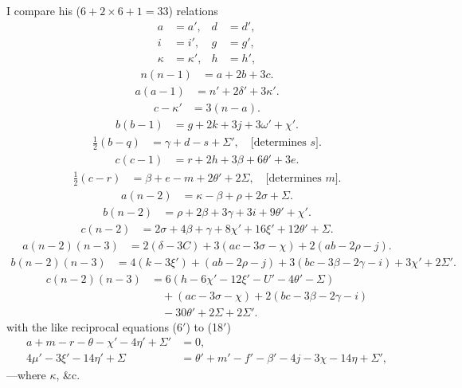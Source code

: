 \documentclass[11pt,a4paper]{article}
\theoremstyle{plain}
\theoremstyle{definition}
\theoremstyle{remark}
\begin{document}
I compare his ($6+2\times6+1=33$) relations
\begin{align*}
a &= a', & d &= d',\\
i &= i', & g &= g',\\
\kappa &= \kappa', & h &= h',
\end{align*}
\begin{align*}
n(n-1) &= a+2b+3c.\tag{6}
\end{align*}
\begin{align*}
a(a-1) &= n'+2\delta'+3\kappa'.\tag{7}
\end{align*}
\begin{align*}
c-\kappa' &= 3(n-a).\tag{8}
\end{align*}
\begin{align*}
b(b-1) &= g+2k+3j+3\omega'+\chi'.\tag{9}
\end{align*}
\begin{align*}
\tfrac{1}{2}(b-q) &= \gamma+d-s+\Sigma',\quad\text{[determines $s$].}\tag{10}
\end{align*}
\begin{align*}
c(c-1) &= r+2h+3\beta+6\theta'+3e.\tag{11}
\end{align*}
\begin{align*}
\tfrac{1}{2}(c-r) &= \beta+e-m+2\theta'+2\Sigma,\quad\text{[determines $m$].}\tag{12}
\end{align*}
\begin{align*}
a(n-2) &= \kappa-\beta+\rho+2\sigma+\Sigma.\tag{13}
\end{align*}
\begin{align*}
b(n-2) &= \rho+2\beta+3\gamma+3i+9\theta'+\chi'.\tag{14}
\end{align*}
\begin{align*}
c(n-2) &= 2\sigma+4\beta+\gamma+8\chi'+16\xi'+12\theta'+\Sigma.\tag{15}
\end{align*}
\begin{align*}
a(n-2)(n-3) &= 2(\delta-3C)+3(ac-3\sigma-\chi)+2(ab-2\rho-j).\tag{16}
\end{align*}
\begin{align*}
b(n-2)(n-3) &= 4(k-3\xi')+(ab-2\rho-j)+3(bc-3\beta-2\gamma-i)+3\chi'+2\Sigma'.\tag{17}
\end{align*}
\begin{align*}
c(n-2)(n-3) &= 6(h-6\chi'-12\xi'-U'-4\theta'-\Sigma)\\
&\quad+(ac-3\sigma-\chi)+2(bc-3\beta-2\gamma-i)\\
&\quad-30\theta'+2\Sigma+2\Sigma'.\tag{18}
\end{align*}
with the like reciprocal equations (6$'$) to (18$'$)
\begin{align*}
a+m-r-\theta-\chi'-4\eta'+\Sigma' &= 0,\\
4\mu'-3\xi'-14\eta'+\Sigma &= \theta'+m'-f'-\beta'-4j-3\chi-14\eta+\Sigma',
\end{align*}
---where $\kappa$, \&c.
\end{document}
